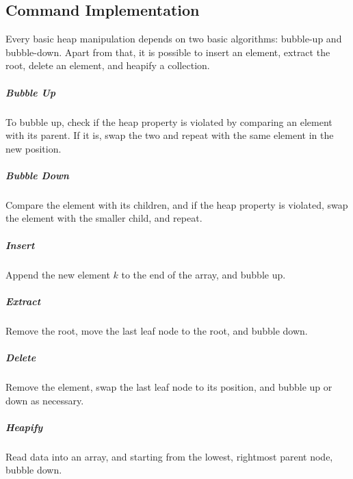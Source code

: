 \documentclass[11pt]{article}
\begin{document}
	\subsection{Command Implementation}
		Every basic heap manipulation depends on two basic algorithms: bubble-up and bubble-down. Apart from that, it is possible to insert an element, extract the root, delete an element, and heapify a collection.
		
		\subparagraph{Bubble Up} To bubble up, check if the heap property is violated by comparing an element with its parent. If it is, swap the two and repeat with the same element in the new position.
		
		\subparagraph{Bubble Down} Compare the element with its children, and if the heap property is violated, swap the element with the smaller child, and repeat.
		
		\subparagraph{Insert} Append the new element $k$ to the end of the array, and bubble up.
		
		\subparagraph{Extract} Remove the root, move the last leaf node to the root, and bubble down.
		
		\subparagraph{Delete} Remove the element, swap the last leaf node to its position, and bubble up or down as necessary.
		
		\subparagraph{Heapify} Read data into an array, and starting from the lowest, rightmost parent node, bubble down.

%		
%		


\end{document}

